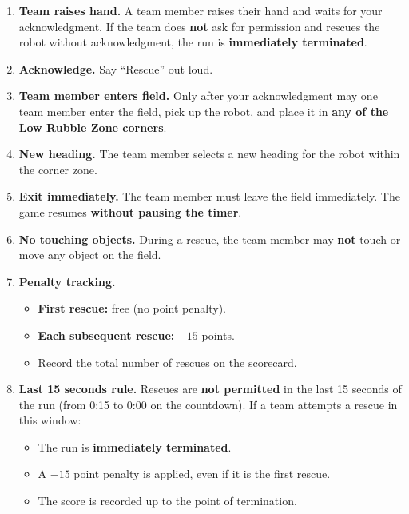 \documentclass[a4]{article}
\begin{document}
\begin{enumerate}
    \item \textbf{Team raises hand.} A team member raises their hand and waits for your acknowledgment. If the team does \textbf{not} ask for permission and rescues the robot without acknowledgment, the run is \textbf{immediately terminated}.

    \item \textbf{Acknowledge.} Say ``Rescue'' out loud.

    \item \textbf{Team member enters field.} Only after your acknowledgment may one team member enter the field, pick up the robot, and place it in \textbf{any of the Low Rubble Zone corners}.

    \item \textbf{New heading.} The team member selects a new heading for the robot within the corner zone.

    \item \textbf{Exit immediately.} The team member must leave the field immediately. The game resumes \textbf{without pausing the timer}.

    \item \textbf{No touching objects.} During a rescue, the team member may \textbf{not} touch or move any object on the field.

    \item \textbf{Penalty tracking.}
    \begin{itemize}
        \item \textbf{First rescue:} free (no point penalty).
        \item \textbf{Each subsequent rescue:} $-15$ points.
        \item Record the total number of rescues on the scorecard.
    \end{itemize}

    \item \textbf{Last 15 seconds rule.} Rescues are \textbf{not permitted} in the last 15 seconds of the run (from 0:15 to 0:00 on the countdown). If a team attempts a rescue in this window:
    \begin{itemize}
        \item The run is \textbf{immediately terminated}.
        \item A $-15$ point penalty is applied, even if it is the first rescue.
        \item The score is recorded up to the point of termination.
    \end{itemize}
\end{enumerate}
\end{document}
